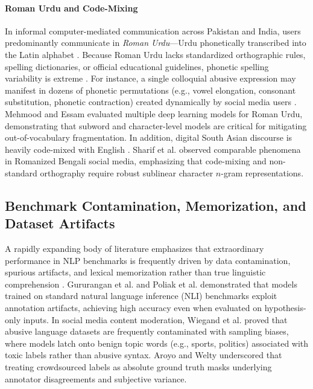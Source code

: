 \documentclass[11pt,a4paper]{article}
\begin{document}
\paragraph{Roman Urdu and Code-Mixing}
In informal computer-mediated communication across Pakistan and India, users predominantly communicate in \textit{Roman Urdu}---Urdu phonetically transcribed into the Latin alphabet \cite{rizwan2020hate,shakeel2020deep}. Because Roman Urdu lacks standardized orthographic rules, spelling dictionaries, or official educational guidelines, phonetic spelling variability is extreme \cite{khan2022roman,arif2021sentiment}. For instance, a single colloquial abusive expression may manifest in dozens of phonetic permutations (e.g., vowel elongation, consonant substitution, phonetic contraction) created dynamically by social media users \cite{akhter2020roman}. Mehmood and Essam \cite{mehmood2020evaluating} evaluated multiple deep learning models for Roman Urdu, demonstrating that subword and character-level models are critical for mitigating out-of-vocabulary fragmentation. In addition, digital South Asian discourse is heavily code-mixed with English \cite{bali2014borrowing,choudhury2017curse}. Sharif et al. \cite{sharif2021offensive} observed comparable phenomena in Romanized Bengali social media, emphasizing that code-mixing and non-standard orthography require robust sublinear character $n$-gram representations.

\subsection{Benchmark Contamination, Memorization, and Dataset Artifacts}
A rapidly expanding body of literature emphasizes that extraordinary performance in NLP benchmarks is frequently driven by data contamination, spurious artifacts, and lexical memorization rather than true linguistic comprehension \cite{gururangan2018annotation,poliak2018hypothesis,elangovan2021memorization,gorman2019we}. Gururangan et al. \cite{gururangan2018annotation} and Poliak et al. \cite{poliak2018hypothesis} demonstrated that models trained on standard natural language inference (NLI) benchmarks exploit annotation artifacts, achieving high accuracy even when evaluated on hypothesis-only inputs. In social media content moderation, Wiegand et al. \cite{wiegand2019inducing} proved that abusive language datasets are frequently contaminated with sampling biases, where models latch onto benign topic words (e.g., sports, politics) associated with toxic labels rather than abusive syntax. Aroyo and Welty \cite{aroyo2015truth} underscored that treating crowdsourced labels as absolute ground truth masks underlying annotator disagreements and subjective variance.
\end{document}
